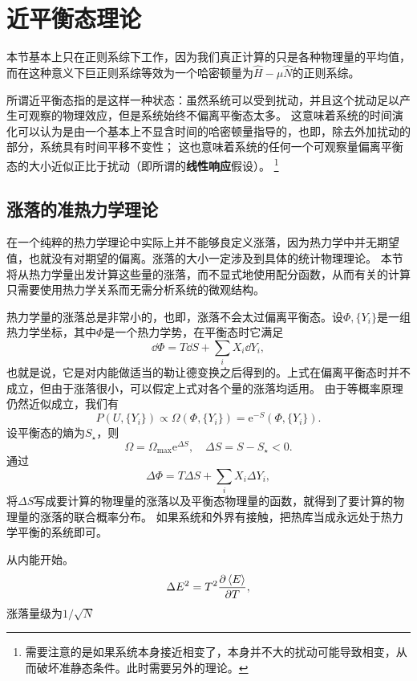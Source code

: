 \documentclass[hyperref, UTF8, a4paper]{ctexart}
\newcommand*{\ee}{\mathrm{e}}
\begin{document}
\section{近平衡态理论}


本节基本上只在正则系综下工作，因为我们真正计算的只是各种物理量的平均值，而在这种意义下巨正则系综等效为一个哈密顿量为$\hat{H}-\mu\hat{N}$的正则系综。

所谓近平衡态指的是这样一种状态：虽然系统可以受到扰动，并且这个扰动足以产生可观察的物理效应，但是系统始终不偏离平衡态太多。
这意味着系统的时间演化可以认为是由一个基本上不显含时间的哈密顿量指导的，也即，除去外加扰动的部分，系统具有时间平移不变性；
这也意味着系统的任何一个可观察量偏离平衡态的大小近似正比于扰动（即所谓的\textbf{线性响应}假设）。%
\footnote{需要注意的是如果系统本身接近相变了，本身并不大的扰动可能导致相变，从而破坏准静态条件。此时需要另外的理论。}%

\subsection{涨落的准热力学理论}

在一个纯粹的热力学理论中实际上并不能够良定义涨落，因为热力学中并无期望值，也就没有对期望的偏离。涨落的大小一定涉及到具体的统计物理理论。
本节将从热力学量出发计算这些量的涨落，而不显式地使用配分函数，从而有关的计算只需要使用热力学关系而无需分析系统的微观结构。

热力学量的涨落总是非常小的，也即，涨落不会太过偏离平衡态。设$\Phi, \{Y_i\}$是一组热力学坐标，其中$\Phi$是一个热力学势，在平衡态时它满足
\[
    \dd{\Phi} = T \dd{S} + \sum_i X_i \dd{Y_i}, 
\]
也就是说，它是对内能做适当的勒让德变换之后得到的。上式在偏离平衡态时并不成立，但由于涨落很小，可以假定上式对各个量的涨落均适用。
由于等概率原理仍然近似成立，我们有
\[
    P(U, \{Y_i\}) \propto \Omega(\Phi, \{Y_i\}) = \ee^{-S}(\Phi, \{Y_i\}).
\]
设平衡态的熵为$S_\star$，则
\begin{equation}
    \Omega = \Omega_\text{max} \ee^{\Delta S}, \quad \Delta S = S - S_\star < 0.
\end{equation}
通过
\[
    \Delta{\Phi} = T \Delta{S} + \sum_i X_i \Delta{Y_i},
\]
将$\Delta S$写成要计算的物理量的涨落以及平衡态物理量的函数，就得到了要计算的物理量的涨落的联合概率分布。
如果系统和外界有接触，把热库当成永远处于热力学平衡的系统即可。

从内能开始。
\begin{equation}
    \Delta E^2 = T^2 \pdv{\expval*{E}}{T},
\end{equation}
涨落量级为$1/\sqrt{N}$
\end{document}
